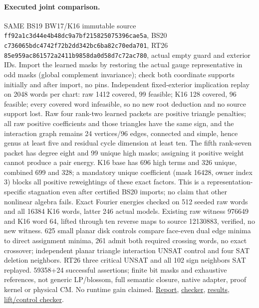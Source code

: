 \documentclass[11pt]{article}
\begin{document}
\paragraph{Executed joint comparison.} SAME BS19 BW17/K16 immutable source \texttt{ff92a1c3d44e4b48dc9a7bf215825075396cae5a}, BS20 \texttt{c736065bdc4742f72b2dd342bc6ba82c70eda701}, RT26 \texttt{85e959ac861572a2411b9858da0d58d7c72ac780}, actual empty guard and exterior IDs. Import the learned masks by restoring the actual gauge representative in odd masks (global complement invariance); check both coordinate supports initially and after import, no pins. Independent fixed-exterior implication replay on 2048 words per chart: raw 1412 covered, 99 feasible; K16 128 covered, 96 feasible; every covered word infeasible, so no new root deduction and no source support lost. Raw four rank-two learned packets are positive triangle penalties; all raw positive coefficients and those triangles have the same sign, and the interaction graph remains 24 vertices/96 edges, connected and simple, hence genus at least five and residual cycle dimension at least ten. The fifth rank-seven packet has degree eight and 99 unique high masks; assigning it positive weight cannot produce a pair energy. K16 base has 696 high terms and 326 unique, combined 699 and 328; a mandatory unique coefficient (mask 16428, owner index 3) blocks all positive reweightings of these exact factors. This is a representation-specific stagnation even after certified BS20 imports; no claim that other nonlinear algebra fails. Exact Fourier energies checked on 512 seeded raw words and all 16384 K16 words, latter 246 actual models. Existing raw witness 976649 and K16 word 64, lifted through ten reverse maps to source 12130883, verified, no new witness. 625 small planar disk controls compare face-even dual edge minima to direct assignment minima, 261 admit both required crossing words, no exact crossover; independent planar triangle interaction UNSAT control and four SAT deletion neighbors. RT26 three critical UNSAT and all 102 sign neighbors SAT replayed. 59358+24 successful assertions; finite bit masks and exhaustive references, not generic LP/blossom, full semantic closure, native adapter, proof kernel or physical CM. No runtime gain claimed. \href{https://github.com/j15marti/pnp/commit/35548df576abfa7ceb0f4363b9d9ed101418757f}{Report}, \href{https://github.com/j15marti/pnp/commit/60fc941b8ae6e94fe3d0876d190ca173060197d7}{checker}, \href{https://github.com/j15marti/pnp/commit/dfbb305e0333a061c68575630ba612479904aaae}{results}, \href{https://github.com/j15marti/pnp/commit/ef4ec22774f666bc06e570e8053effb782c193e7}{lift/control checker}.
\end{document}
